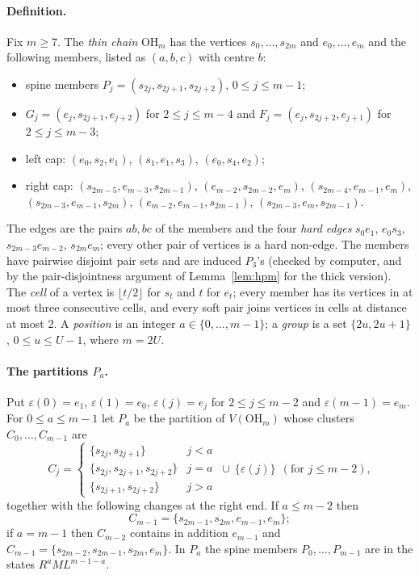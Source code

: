 \paragraph{Definition.} Fix $m\ge7$. The \emph{thin chain} $\mathrm{OH}_m$ has the vertices $s_0,\dots,s_{2m}$ and $e_0,\dots,e_m$ and the following members, listed as $(a,b,c)$ with centre $b$:
\begin{itemize}
\item spine members $P_j=(s_{2j},s_{2j+1},s_{2j+2})$, $0\le j\le m-1$;
\item $G_j=(e_j,s_{2j+1},e_{j+2})$ for $2\le j\le m-4$ and $F_j=(e_j,s_{2j+2},e_{j+1})$ for $2\le j\le m-3$;
\item left cap: $(e_0,s_2,e_1)$, $(s_1,e_1,s_3)$, $(e_0,s_4,e_2)$;
\item right cap: $(s_{2m-5},e_{m-3},s_{2m-1})$, $(e_{m-2},s_{2m-2},e_m)$, $(s_{2m-4},e_{m-1},e_m)$, $(s_{2m-3},e_{m-1},s_{2m})$, $(e_{m-2},e_{m-1},s_{2m-1})$, $(s_{2m-3},e_m,s_{2m-1})$.
\end{itemize}
The edges are the pairs $ab,bc$ of the members and the four \emph{hard edges} $s_0e_1$, $e_0s_3$, $s_{2m-3}e_{m-2}$, $s_{2m}e_m$; every other pair of vertices is a hard non-edge. The members have pairwise disjoint pair sets and are induced $P_3$'s (checked by computer, and by the pair-disjointness argument of Lemma~\ref{lem:hpm} for the thick version). The \emph{cell} of a vertex is $\lfloor t/2\rfloor$ for $s_t$ and $t$ for $e_t$; every member has its vertices in at most three consecutive cells, and every soft pair joins vertices in cells at distance at most $2$. A \emph{position} is an integer $a\in\{0,\dots,m-1\}$; a \emph{group} is a set $\{2u,2u+1\}$, $0\le u\le U-1$, where $m=2U$.

\paragraph{The partitions $P_a$.} Put $\varepsilon(0)=e_1$, $\varepsilon(1)=e_0$, $\varepsilon(j)=e_j$ for $2\le j\le m-2$ and $\varepsilon(m-1)=e_m$. For $0\le a\le m-1$ let $P_a$ be the partition of $V(\mathrm{OH}_m)$ whose clusters $C_0,\dots,C_{m-1}$ are
\[
C_j=\begin{cases}\{s_{2j},s_{2j+1}\}&j<a\\ \{s_{2j},s_{2j+1},s_{2j+2}\}&j=a\\ \{s_{2j+1},s_{2j+2}\}&j>a\end{cases}\ \cup\ \{\varepsilon(j)\}\ \ (\text{for }j\le m-2),
\]
together with the following changes at the right end. If $a\le m-2$ then
\[C_{m-1}=\{s_{2m-1},\allowbreak s_{2m},\allowbreak e_{m-1},\allowbreak e_m\};\]
if $a=m-1$ then $C_{m-2}$ contains in addition $e_{m-1}$ and $C_{m-1}=\{s_{2m-2},\allowbreak s_{2m-1},\allowbreak s_{2m},\allowbreak e_m\}$. In $P_a$ the spine members $P_0,\dots,P_{m-1}$ are in the states $R^{a}ML^{m-1-a}$.


